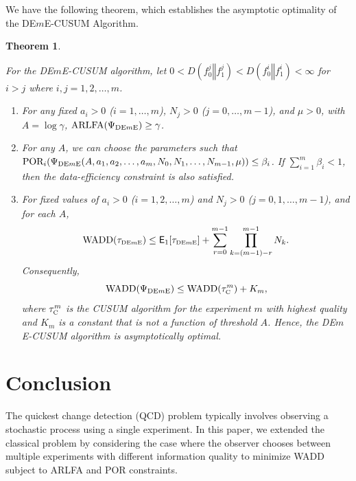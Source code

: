 \documentclass[journal, onecolumn]{IEEEtran}
\def\ds{\displaystyle}  %
\newtheorem{theorem}{Theorem}
\begin{document}
We have the following theorem, which establishes the asymptotic optimality of the DE$m$E-CUSUM Algorithm.

\begin{theorem}
\label{thm:deme}

For the \textup{DE$m$E-CUSUM} algorithm, let
$ 0 < D(f_0^j \mathrel{\Vert} f_1^j) < D(f_0^i \mathrel{\Vert} f_1^i) < \infty $
for $i > j$ where $i, j = 1, 2, \dots, m$.

\begin{enumerate}
\item For any fixed $a_i > 0$ ($i = 1, \dots, m$), $N_j > 0$ ($j = 0, \dots, m - 1$), and $\mu > 0$, with $A = \log \gamma$, $\textup{ARLFA} (\Psi_{\textup{DE$m$E}}) \geq \gamma$.

\item For any $A$, we can choose the parameters such that $\textup{POR}_i (\Psi_{\textup{DE$m$E}} (A, a_1, a_2, \dots, a_m, N_0, N_1, \dots, N_{m - 1}, \mu)) \leq \beta_i$. If $\ds \sum_{i = 1}^m \beta_i < 1$, then the data-efficiency constraint is also satisfied.

\item For fixed values of $a_i > 0$ ($i = 1, 2, \dots, m$) and $N_j > 0$ ($j = 0, 1, \dots, m - 1$), and for each $A$,
$$ \textup{WADD} (\tau_{\textup{\fontsize{6 pt}{10 pt}\selectfont DE$m$E}}) \leq \mathsf{E}_1 [\tau_{\textup{\fontsize{6 pt}{10 pt}\selectfont DE$m$E}}] + \sum_{r = 0}^{m - 1} \prod_{k = (m - 1) - r}^{m - 1} N_k. $$
Consequently,
$$ \textup{WADD} (\Psi_{\textup{DE$m$E}}) \leq \textup{WADD} (\tau_{\textup{\fontsize{6 pt}{10 pt}\selectfont C}}^m) + K_m, $$
where $\tau_{\textup{\fontsize{6 pt}{10 pt}\selectfont C}}^m$ is the \textup{CUSUM} algorithm for the experiment $m$ with highest quality and $K_m$ is a constant that is not a function of threshold $A$. Hence, the \textup{DE$m$E-CUSUM} algorithm is asymptotically optimal.
\end{enumerate}

\end{theorem}






\section{Conclusion}
\label{sec:conclusion}

The quickest change detection (QCD) problem typically involves observing a stochastic process using a single experiment. In this paper, we extended the classical problem by considering the case where the observer chooses between multiple experiments with different information quality to minimize WADD subject to ARLFA and POR constraints.
\end{document}
